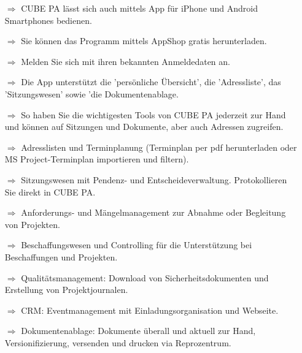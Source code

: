 \documentclass{article}
\begin{document}

\begin{multicols}{2}

\begin{tcolorbox}[colback=blue!5,colframe=blue!40!black,title=Mobile CUBE PA Version]
\begin{itemize}
  \item[$\Longrightarrow$] CUBE PA lässt sich auch mittels App für iPhone und Android Smartphones bedienen.
  \item[$\Longrightarrow$] Sie können das Programm mittels AppShop gratis herunterladen.
  \item[$\Longrightarrow$] Melden Sie sich mit ihren bekannten Anmeldedaten an.
  \item[$\Longrightarrow$] Die App unterstützt die 'persönliche Übersicht', die 'Adressliste', das 'Sitzungswesen' sowie 'die Dokumentenablage.
	\item[$\Longrightarrow$] So haben Sie die wichtigesten Tools von CUBE PA jederzeit zur Hand und können auf Sitzungen und Dokumente, aber auch Adressen zugreifen.
\end{itemize}
\begin{centering}
\end{centering}
\end{tcolorbox}


\begin{tcolorbox}[colback=blue!5,colframe=blue!40!black,title=Die verfügbaren Module von CUBE PA]
\begin{itemize}
  \item[$\Longrightarrow$] Adresslisten und Terminplanung (Terminplan per pdf herunterladen oder MS Project-Terminplan importieren und filtern).
  \item[$\Longrightarrow$] Sitzungswesen mit Pendenz- und Entscheideverwaltung. Protokollieren Sie direkt in CUBE PA.
	\item[$\Longrightarrow$] Anforderungs- und Mängelmanagement zur Abnahme oder Begleitung von Projekten.
	\item[$\Longrightarrow$] Beschaffungswesen und Controlling für die Unterstützung bei Beschaffungen und Projekten.
		\item[$\Longrightarrow$] Qualitätsmanagement: Download von Sicherheitsdokumenten und Erstellung von Projektjournalen.
		\item[$\Longrightarrow$] CRM: Eventmanagement mit Einladungsorganisation und Webseite.
		\item[$\Longrightarrow$] Dokumentenablage: Dokumente überall und aktuell zur Hand, Versionifizierung, versenden und drucken via Reprozentrum.
\end{itemize}
\end{tcolorbox}


\end{multicols}
\end{document}
